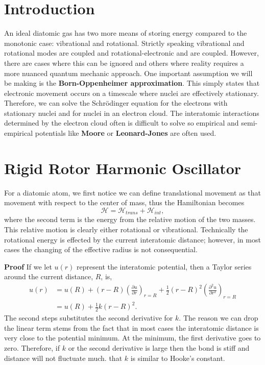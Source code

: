 \section{Introduction}%
\label{sec:Intro}
An ideal diatomic gas has two more means of storing energy compared to the
monotonic case: vibrational and rotational. Strictly speaking vibrational and
rotational modes are coupled and rotational-electronic and are coupled. However,
there are cases where this can be ignored and others where reality requires a
more nuanced quantum mechanic approach. One important assumption we will be
making is the \textbf{Born-Oppenheimer approximation}. This simply states that
electronic movement occurs on a timescale where nuclei are effectively
stationary. Therefore, we can solve the Schrödinger equation for the electrons
with stationary nuclei and for nuclei in an electron cloud. The interatomic
interactions determined by the electron cloud often is difficult to solve so
empirical and semi-empirical potentials like \textbf{Moore} or
\textbf{Leonard-Jones} are often used.

\section{Rigid Rotor Harmonic Oscillator}%
\label{sec:RR}
For a diatomic atom, we first notice we can define translational movement as
that movement with respect to the center of mass, thus the Hamiltonian becomes
\begin{equation*}
	\mathcal{H} = \mathcal{H}_{trans} + \mathcal{H}_{int},
\end{equation*}
where the second term is the energy from the relative motion of the two masses.
This relative motion is clearly either rotational or vibrational. Technically
the rotational energy is effected by the current interatomic distance; however,
in most cases the changing of the effective radius is not consequential.

\textbf{Proof}
If we let $u(r)$ represent the interatomic potential, then a Taylor series
around the current distance, $R$, is,
\begin{align*}
	u(r) &= u(R) + (r - R)\left(\frac{\partial u}{\partial r}\right)_{r=R} +
	\frac{1}{2}(r - R)^2 \left(\frac{\partial^{2} u}{\partial
	r^2}\right)_{r=R}\\
		 &= u(R) + \frac{1}{2}k(r - R)^2.
\end{align*}
The second steps substitutes the second derivative for $k$. The reason we can
drop the linear term stems from the fact that in most cases the interatomic
distance is very close to the potential minimum. At the minimum, the first
derivative goes to zero. Therefore, if $k$ or the second derivative is large
then the bond is stiff and distance will not fluctuate much. \note%
that $k$ is similar to Hooke's constant.

